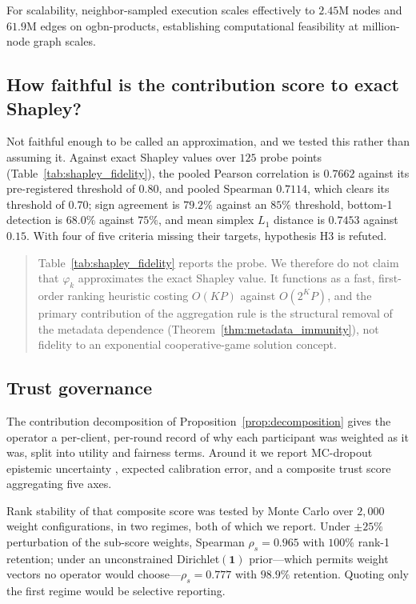 \documentclass[preprint,12pt]{elsarticle}
\theoremstyle{plain}
\theoremstyle{definition}
\theoremstyle{remark}
\begin{document}
For scalability, neighbor-sampled execution scales effectively to $2.45$M nodes and $61.9$M edges on ogbn-products, establishing computational feasibility at million-node graph scales.

\subsection{How faithful is the contribution score to exact Shapley?}
\label{sec:res_shapley}



Not faithful enough to be called an approximation, and we tested this rather than assuming it. Against exact Shapley values over $125$ probe points (Table~\ref{tab:shapley_fidelity}), the pooled Pearson correlation is $0.7662$ against its pre-registered threshold of $0.80$, and pooled Spearman $0.7114$, which clears its threshold of $0.70$; sign agreement is $79.2\%$ against an $85\%$ threshold, bottom-1 detection is $68.0\%$ against $75\%$, and mean simplex $L_1$ distance is $0.7453$ against $0.15$. With four of five criteria missing their targets, hypothesis H3 is refuted.

\begin{quote}
Table~\ref{tab:shapley_fidelity} reports the probe. We therefore do not claim that $\varphi_k$ approximates the exact Shapley value. It functions as a fast, first-order ranking heuristic costing $O(KP)$ against $O(2^K P)$, and the primary contribution of the aggregation rule is the structural removal of the metadata dependence (Theorem~\ref{thm:metadata_immunity}), not fidelity to an exponential cooperative-game solution concept.
\end{quote}

\subsection{Trust governance}
\label{sec:governance}



The contribution decomposition of Proposition~\ref{prop:decomposition} gives the operator a per-client, per-round record of why each participant was weighted as it was, split into utility and fairness terms. Around it we report MC-dropout epistemic uncertainty \cite{gal2016dropout}, expected calibration error, and a composite trust score aggregating five axes.

Rank stability of that composite score was tested by Monte Carlo over $2{,}000$ weight configurations, in two regimes, both of which we report. Under $\pm25\%$ perturbation of the sub-score weights, Spearman $\rho_s = 0.965$ with $100\%$ rank-1 retention; under an unconstrained Dirichlet$(\bm{1})$ prior---which permits weight vectors no operator would choose---$\rho_s = 0.777$ with $98.9\%$ retention. Quoting only the first regime would be selective reporting.
\end{document}
